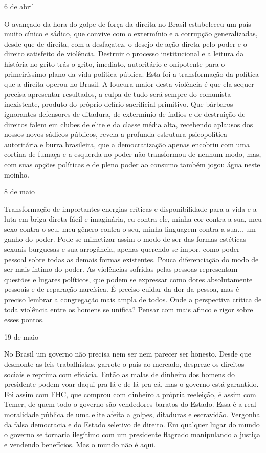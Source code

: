 6 de abril

O avançado da hora do golpe de força da direita no Brasil estabeleceu um
país muito cínico e sádico, que convive com o extermínio e a corrupção
generalizadas, desde que de direita, com a desfaçatez, o desejo de ação
direta pelo poder e o direito satisfeito de violência. Destruir o
processo institucional e a leitura da história no grito trás o grito,
imediato, autoritário e onipotente para o primeiríssimo plano da vida
política pública. Esta foi a transformação da política que a direita
operou no Brasil. A loucura maior desta violência é que ela sequer
precisa apresentar resultados, a culpa de tudo será sempre do comunista
inexistente, produto do próprio delírio sacrificial primitivo. Que
bárbaros ignorantes defensores de ditadura, de extermínio de índios e de
destruição de direitos falem em clubes de elite e da classe média alta,
recebendo aplausos dos nossos novos sádicos públicos, revela a profunda
estrutura psicopolítica autoritária e burra brasileira, que a
democratização apenas encobriu com uma cortina de fumaça e a esquerda no
poder não transformou de nenhum modo, mas, com suas opções políticas e
de pleno poder ao consumo também jogou água neste moinho.

8 de maio

Transformação de importantes energias críticas e disponibilidade para a
vida e a luta em briga direta fácil e imaginária, eu contra ele, minha
cor contra a sua, meu sexo contra o seu, meu gênero contra o seu, minha
linguagem contra a sua... um ganho do poder. Pode-se mimetizar assim o
modo de ser das formas estéticas sexuais burguesas e sua arrogância,
apenas querendo se impor, como poder pessoal sobre todas as demais
formas existentes. Pouca diferenciação do modo de ser mais íntimo do
poder. As violências sofridas pelas pessoas representam questões e
lugares políticos, que podem se expressar como dores absolutamente
pessoais e de reparação narcísica. É preciso cuidar da dor da pessoa,
mas é preciso lembrar a congregação mais ampla de todos. Onde a
perspectiva crítica de toda violência entre os homens se unifica? Pensar
com mais afinco e rigor sobre esses pontos.

19 de maio

No Brasil um governo não precisa nem ser nem parecer ser honesto. Desde
que desmonte as leis trabalhistas, garrote o país ao mercado, despreze
os direitos sociais e reprima com eficácia. Então as malas de dinheiro
dos homens do presidente podem voar daqui pra lá e de lá pra cá, mas o
governo está garantido. Foi assim com FHC, que comprou com dinheiro a
própria reeleição, é assim com Temer, de quem todo o governo são
vendedores baratos do Estado. Essa é a real moralidade pública de uma
elite afeita a golpes, ditaduras e escravidão. Vergonha da falsa
democracia e do Estado seletivo de direito. Em qualquer lugar do mundo o
governo se tornaria ilegítimo com um presidente flagrado manipulando a
justiça e vendendo benefícios. Mas o mundo não é aqui.

